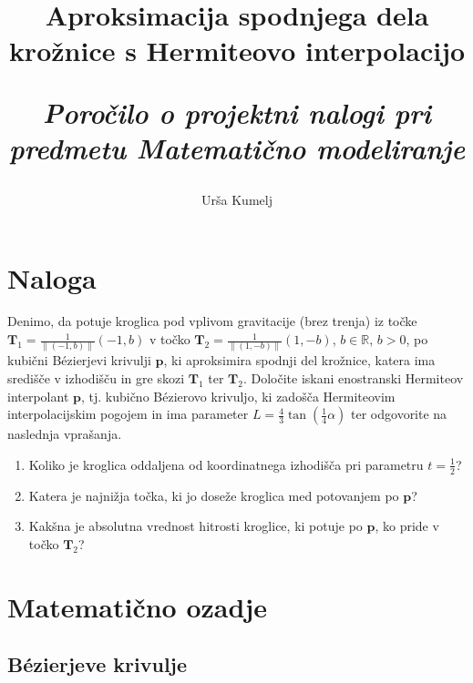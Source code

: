\documentclass[a4paper,12pt]{article}
\title{\textbf{\huge Aproksimacija spodnjega dela krožnice s Hermiteovo interpolacijo}
	
	\Large \it Poročilo o projektni nalogi pri predmetu Matematično modeliranje}
\author{Urša Kumelj}
\begin{document}
	
	\maketitle
	
	\tableofcontents

	\newpage

	\section{Naloga}
	Denimo, da potuje kroglica pod vplivom gravitacije (brez trenja) iz točke $\boldsymbol{T}_1 = \frac{1}{\| (-1,b) \|} (-1,b)$ v točko $\boldsymbol{T}_2 = \frac{1}{\|(1,-b)\|}(1,-b)$, $b \in \mathbb{R}$, $b>0$, po
	kubični B\'{e}zierjevi krivulji $\boldsymbol{p}$, ki aproksimira spodnji del krožnice, katera
	ima središče v izhodišču in gre skozi $\boldsymbol{T}_1$ ter $\boldsymbol{T}_2$. Določite iskani enostranski Hermiteov interpolant $\boldsymbol{p}$, tj. kubično B\'{e}zierovo krivuljo, ki zadošča Hermiteovim interpolacijskim pogojem in ima parameter 
	$L = \frac{4}{3} \tan(\frac{1}{4}\alpha)$ ter odgovorite na naslednja vprašanja.
	\begin{enumerate}[label=(\alph*)]
		\item Koliko je kroglica oddaljena od koordinatnega izhodišča pri parametru $t = \frac{1}{2}$?
		\item Katera je najnižja točka, ki jo doseže kroglica med potovanjem po $\boldsymbol{p}$?
		\item Kakšna je absolutna vrednost hitrosti kroglice, ki potuje po $\boldsymbol{p}$, ko
		pride v točko $\boldsymbol{T}_2$?

	\end{enumerate}

	
	\section{Matematično ozadje}
	
	\subsection{B\'{e}zierjeve krivulje}
	
\end{document}
